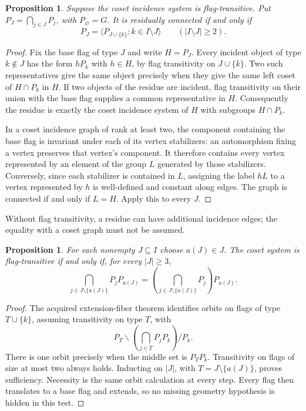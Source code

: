 \documentclass[11pt,a4paper]{article}
\newtheorem{proposition}[theorem]{Proposition}
\newcommand{\gen}[1]{\langle#1\rangle}
\begin{document}
\begin{proposition}\label{prop:dehon}
Suppose the coset incidence system is flag-transitive.  Put
$P_J=\bigcap_{j\in J}P_j$, with $P_\varnothing=G$.
It is residually connected if and only if
\[
       P_J=\gen{P_{J\cup\{k\}}:k\in I\setminus J}
                    \qquad(|I\setminus J|\ge2).
\]
\end{proposition}
\begin{proof}
Fix the base flag of type $J$ and write $H=P_J$.
Every incident object of type $k\notin J$ has the form $hP_k$ with
$h\in H$, by flag transitivity on $J\cup\{k\}$.  Two such representatives
give the same object precisely when they give the same left coset of
$H\cap P_k$ in $H$.  If two objects of the residue are incident, flag
transitivity on their union with the base flag supplies a common
representative in $H$.  Consequently the residue is exactly the coset
incidence system of $H$ with subgroups $H\cap P_k$.

In a coset incidence graph of rank at least two, the component containing
the base flag is invariant under each of its vertex stabilizers: an
automorphism fixing a vertex preserves that vertex's component.  It
therefore contains every vertex represented by an element of the group
$L$ generated by those stabilizers.  Conversely, since each stabilizer
is contained in $L$, assigning the label $hL$ to a vertex represented by
$h$ is well-defined and constant along edges.  The graph is connected
if and only if $L=H$.  Apply this to every $J$.
\end{proof}
Without flag transitivity, a residue can have additional incidence edges;
the equality with a coset graph must not be assumed.

\begin{proposition}\label{prop:flagtest}
For each nonempty $J\subseteq I$ choose $a(J)\in J$.
The coset system is flag-transitive if and only if, for every $|J|\ge3$,
\[
 \bigcap_{j\in J\setminus\{a(J)\}}P_jP_{a(J)}
       =\left(\bigcap_{j\in J\setminus\{a(J)\}}P_j\right)P_{a(J)}.
\]
\end{proposition}
\begin{proof}
The acquired extension-fiber theorem identifies orbits on flags of type
$T\cup\{k\}$, assuming transitivity on type $T$, with
\[
 P_T\backslash\left(\bigcap_{j\in T}P_jP_k\right)/P_k.
\]
There is one orbit precisely when the middle set is $P_TP_k$.
Transitivity on flags of size at most two always holds.  Inducting on
$|J|$, with $T=J\setminus\{a(J)\}$, proves sufficiency.  Necessity
is the same orbit calculation at every step.  Every flag then translates
to a base flag and extends, so no missing geometry hypothesis is hidden
in this test.
\end{proof}
\end{document}
